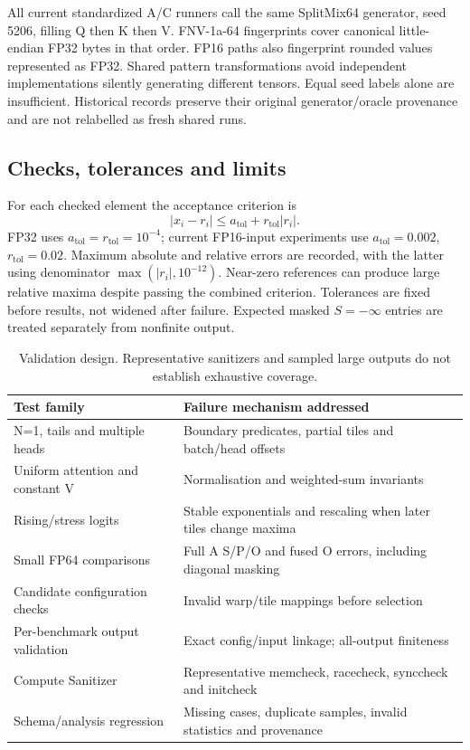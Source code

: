 \documentclass[11pt,a4paper]{article}
\begin{document}
All current standardized A/C runners call the same SplitMix64 generator,
seed 5206, filling Q then K then V. FNV-1a-64 fingerprints cover canonical
little-endian FP32 bytes in that order. FP16 paths also fingerprint rounded
values represented as FP32. Shared pattern transformations avoid independent
implementations silently generating different tensors. Equal seed labels alone
are insufficient. Historical records preserve their original generator/oracle
provenance and are not relabelled as fresh shared runs.

\subsection{Checks, tolerances and limits}
For each checked element the acceptance criterion is
\begin{equation}
 |x_i-r_i|\leq a_{\mathrm{tol}}+r_{\mathrm{tol}}|r_i|.
 \label{eq:tolerance}
\end{equation}
FP32 uses $a_{\mathrm{tol}}=r_{\mathrm{tol}}=10^{-4}$; current FP16-input experiments
use $a_{\mathrm{tol}}=0.002$, $r_{\mathrm{tol}}=0.02$. Maximum absolute and relative
errors are recorded, with the latter using denominator $\max(|r_i|,10^{-12})$.
Near-zero references can produce large relative maxima despite passing the
combined criterion. Tolerances are fixed before results, not widened after failure.
Expected masked $S=-\infty$ entries are treated separately from nonfinite output.

\begin{table}[tbp]\centering\small
\begin{tabularx}{\linewidth}{@{}lY@{}}\toprule
Test family & Failure mechanism addressed\\\midrule
N=1, tails and multiple heads & Boundary predicates, partial tiles and batch/head offsets\\
Uniform attention and constant V & Normalisation and weighted-sum invariants\\
Rising/stress logits & Stable exponentials and rescaling when later tiles change maxima\\
Small FP64 comparisons & Full A S/P/O and fused O errors, including diagonal masking\\
Candidate configuration checks & Invalid warp/tile mappings before selection\\
Per-benchmark output validation & Exact config/input linkage; all-output finiteness\\
Compute Sanitizer & Representative memcheck, racecheck, synccheck and initcheck\\
Schema/analysis regression & Missing cases, duplicate samples, invalid statistics and provenance\\
\bottomrule\end{tabularx}
\caption{Validation design. Representative sanitizers and sampled large outputs do not establish exhaustive coverage.}\label{tab:validation}
\end{table}
\end{document}
